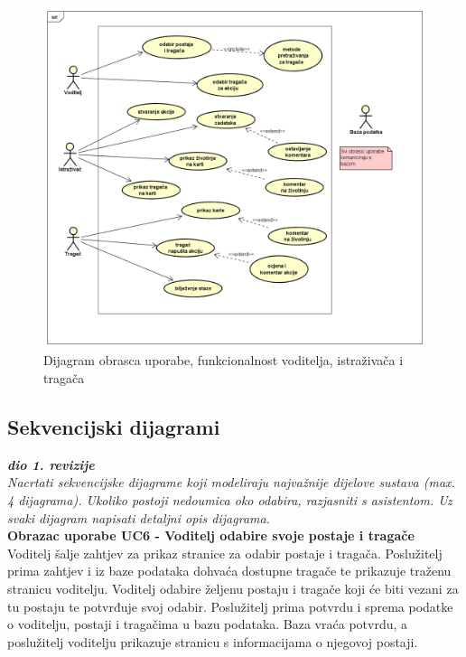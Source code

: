 				\begin{figure}[H]
					\includegraphics[scale=0.5]{slike/dijagram2.PNG} %
					\centering
					\caption{Dijagram obrasca uporabe, funkcionalnost voditelja, istraživača i tragača}
					\label{fig:dijagram2} %
				\end{figure}
				
			\subsection{Sekvencijski dijagrami}
				
				\textbf{\textit{dio 1. revizije}}\\
				
				\textit{Nacrtati sekvencijske dijagrame koji modeliraju najvažnije dijelove sustava (max. 4 dijagrama). Ukoliko postoji nedoumica oko odabira, razjasniti s asistentom. Uz svaki dijagram napisati detaljni opis dijagrama.}\\
				
				\noindent \textbf{Obrazac uporabe UC6 - Voditelj odabire svoje postaje i tragače}\\
				
				\noindent Voditelj šalje zahtjev za prikaz stranice za odabir postaje i tragača. Poslužitelj prima zahtjev i iz baze podataka dohvaća dostupne tragače te prikazuje traženu stranicu voditelju. Voditelj odabire željenu postaju i tragače koji će biti vezani za tu postaju te potvrđuje svoj odabir. Poslužitelj prima potvrdu i sprema podatke o voditelju, postaji i tragačima u bazu podataka. Baza vraća potvrdu, a poslužitelj voditelju prikazuje stranicu s informacijama o njegovoj postaji.
				

